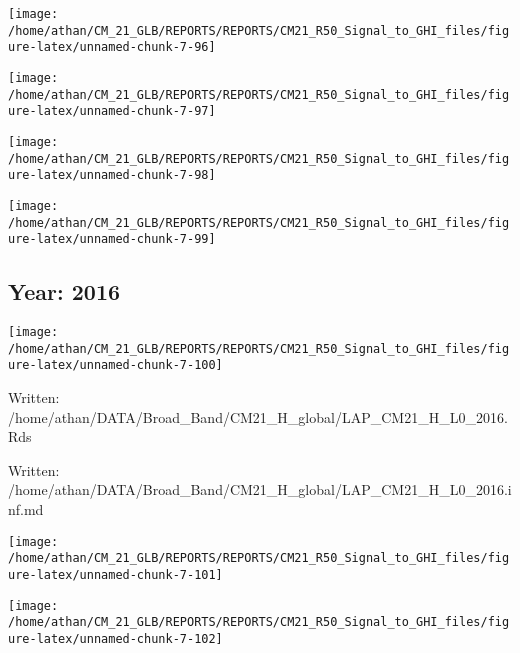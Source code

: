 \documentclass[
  11pt,
  a4paper,oneside]{article}
\begin{document}
\begin{center}\texttt{[image: /home/athan/CM\_21\_GLB/REPORTS/REPORTS/CM21\_R50\_Signal\_to\_GHI\_files/figure-latex/unnamed-chunk-7-96]} \end{center}

\begin{center}\texttt{[image: /home/athan/CM\_21\_GLB/REPORTS/REPORTS/CM21\_R50\_Signal\_to\_GHI\_files/figure-latex/unnamed-chunk-7-97]} \end{center}

\begin{center}\texttt{[image: /home/athan/CM\_21\_GLB/REPORTS/REPORTS/CM21\_R50\_Signal\_to\_GHI\_files/figure-latex/unnamed-chunk-7-98]} \end{center}

\begin{center}\texttt{[image: /home/athan/CM\_21\_GLB/REPORTS/REPORTS/CM21\_R50\_Signal\_to\_GHI\_files/figure-latex/unnamed-chunk-7-99]} \end{center}

\FloatBarrier

\newpage

\hypertarget{year-2016}{%
\subsection{Year: 2016}\label{year-2016}}

\begin{center}\texttt{[image: /home/athan/CM\_21\_GLB/REPORTS/REPORTS/CM21\_R50\_Signal\_to\_GHI\_files/figure-latex/unnamed-chunk-7-100]} \end{center}

Written: /home/athan/DATA/Broad\_Band/CM21\_H\_global/LAP\_CM21\_H\_L0\_2016.Rds

Written: /home/athan/DATA/Broad\_Band/CM21\_H\_global/LAP\_CM21\_H\_L0\_2016.inf.md

\begin{center}\texttt{[image: /home/athan/CM\_21\_GLB/REPORTS/REPORTS/CM21\_R50\_Signal\_to\_GHI\_files/figure-latex/unnamed-chunk-7-101]} \end{center}

\begin{center}\texttt{[image: /home/athan/CM\_21\_GLB/REPORTS/REPORTS/CM21\_R50\_Signal\_to\_GHI\_files/figure-latex/unnamed-chunk-7-102]} \end{center}
\end{document}
